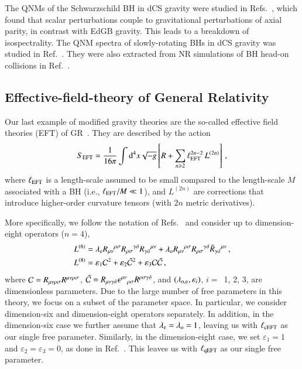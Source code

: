 \documentclass[twocolumn,
               prd,
               aps,
               superscriptaddress,
               tightenlines,
               nofootinbib,
               eqsecnum,
               amsfonts,
               amsmath,
               longbibliography]{revtex4-1}
\newcommand{\dd}{{\rm d}}
\newcommand{\lame}{\lambda_{\rm e}}
\newcommand{\lamo}{\lambda_{\rm o}}
\begin{document}
The QNMs of the Schwarzschild BH in dCS gravity were studied in
Refs.~\cite{Yunes:2007ss,Cardoso:2009pk,Molina:2010fb}, which found that scalar
perturbations couple to gravitational perturbations of axial parity, in contrast
with EdGB gravity.
%
This leads to a breakdown of isospectrality. The QNM spectra of slowly-rotating BHs in dCS gravity was
studied in Ref.~\cite{Srivastava:2021imr,Wagle:2021tam}.
%
They were also extracted from NR simulations of BH head-on collisions in Ref.~\cite{Okounkova:2019dfo}.

\subsection{Effective-field-theory of General Relativity}

Our last example of modified gravity theories are the so-called effective field
theories (EFT) of GR~\cite{Endlich:2017tqa,Sennett:2019bpc,deRham:2020ejn,Cano:2020cao,Cano:2021myl}.
%
They are described by the action
%
\begin{equation} \label{eq:action_eft}
    S_{\rm EFT} = \frac{1}{16 \pi}
    \int \dd^4x \sqrt{-g}
    \left[ R
    +
    \sum_{n \geqslant 2} \ell_{\rm EFT}^{2n - 2}\, L^{(2n)}
    \right]\,,
\end{equation}
%
where $\ell_{\rm EFT}$ is a length-scale assumed to be small compared to the length-scale $M$
associated with a BH (i.e., $\ell_{\rm EFT} / M \ll 1$), and $L^{(2n)}$ are corrections
that introduce higher-order curvature tensors (with $2n$ metric derivatives).

More specifically, we follow the notation of
Refs.~\cite{Cano:2020cao,Cano:2021myl} and consider up to dimension-eight
operators ($n=4$),
%
\begin{subequations}
\label{eq:action_mods}
\begin{align}
    L^{(6)} &= \lame R_{\mu\nu}{}^{\rho\sigma} R_{\rho\sigma}{}^{\gamma\delta} R_{\gamma \delta}{}^{\mu\nu}
    + \lamo R_{\mu\nu}{}^{\rho\sigma} R_{\rho\sigma}{}^{\gamma\delta} \tilde{R}_{\gamma \delta}{}^{\mu\nu}\,,
    \label{eq:s_6}
    \\
    L^{(8)} &= \varepsilon_{1} \mathcal{C}^2
    + \varepsilon_{2} \tilde{\mathcal{C}}^{2}
    + \varepsilon_{3} \mathcal{C} \tilde{\mathcal{C}}\,,
\label{eq:s_8}
\end{align}
\end{subequations}
%
where ${\cal C} = R_{\mu\nu\rho\sigma} R^{\mu\nu\rho\sigma}$,
$\tilde{\cal C} = R_{\mu\nu\gamma\delta} \epsilon^{\mu\nu}{}_{\rho\sigma} R^{\rho\sigma\gamma\delta}$,
and $(\lambda_{\rm o, e},\varepsilon_{i})$, $i=$~1, 2, 3, are dimensionless parameters.
%
Due to the large number of free parameters in this theory, we focus on a subset of the parameter space.
%
In particular, we consider dimension-six and dimension-eight operators separately.
%
In addition, in the dimension-six case we further assume that $\lame = \lamo = 1$,
leaving us with $\ell_{\rm cEFT}$ as our single free parameter.
%
Similarly, in the dimension-eight case, we set $\varepsilon_{1} = 1$ and $\varepsilon_{2} = \varepsilon_{3} = 0$,
as done in Ref.~\cite{Sennett:2019bpc}.
%
This leaves us with $\ell_{\rm qEFT}$ as our single free parameter.
\end{document}
